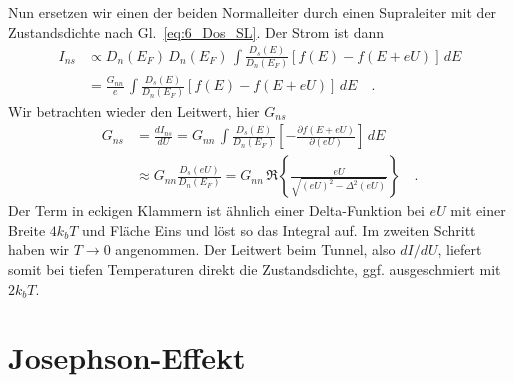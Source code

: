 Nun ersetzen  wir einen der beiden Normalleiter durch einen Supraleiter mit der Zustandsdichte nach 
Gl.~\ref{eq:6_Dos_SL}. Der Strom ist dann 
\begin{align}
    I_{ns} &\propto D_n(E_F) \, D_{n}(E_F)  \, \int  \frac{D_s(E)}{D_n(E_F)} [f(E) - f(E + e U)] \, dE \\
      & = \frac{ G_{nn}}{e} \, \int  \frac{D_s(E)}{D_n(E_F)} [f(E) - f(E + e U)] \, dE  \quad . \label{eq:6_Ins}
\end{align}
Wir betrachten  wieder den Leitwert, hier $G_{ns}$ 
\begin{align}
    G_{ns} & = \frac{d I_{ns}}{d U} =  G_{nn} \, \int  \frac{D_s(E)}{D_n(E_F)} 
    \left[ - \frac{\partial f(E+ eU)}{\partial (eU)} \right] \, dE  \\
      & \approx   G_{nn} \frac{D_s(eU)}{D_n(E_F)}  =  
      G_{nn} \, \Re \left\{ \frac{eU}{\sqrt{ (eU)^2 - \Delta^2(eU)}} \right\} \quad .
\end{align}
Der Term in eckigen Klammern ist ähnlich einer Delta-Funktion bei $eU$ mit einer Breite $4 k_b T$ und Fläche Eins und löst so das Integral auf. Im zweiten Schritt haben wir $T \rightarrow 0$ angenommen. Der Leitwert beim Tunnel, also $dI/dU$, liefert somit bei tiefen Temperaturen direkt die Zustandsdichte, ggf. ausgeschmiert mit $2 k_b T$.


\section*{Josephson-Effekt}


